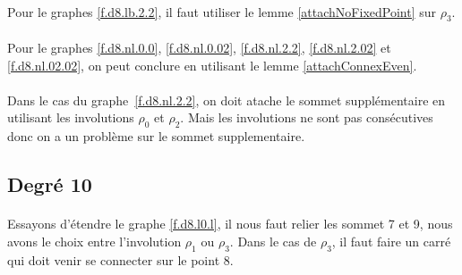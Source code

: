 \paragraph{}
Pour le graphes \ref{f.d8.lb.2.2}, il faut utiliser le lemme \ref{attachNoFixedPoint} sur $\rho_3$.

\paragraph{}
Pour le graphes \ref{f.d8.nl.0.0}, \ref{f.d8.nl.0.02}, \ref{f.d8.nl.2.2}, \ref{f.d8.nl.2.02} et \ref{f.d8.nl.02.02}, on peut conclure en utilisant le lemme \ref{attachConnexEven}.

\paragraph{}
Dans le cas du graphe~\ref{f.d8.nl.2.2}, on doit atache le sommet supplémentaire en utilisant les involutions $\rho_0$ et $\rho_2$. Mais les involutions ne sont pas consécutives donc on a un problème sur le sommet supplementaire.

\subsection{Degré 10}

\paragraph{}
Essayons d'étendre le graphe \ref{f.d8.l0.l}, il nous faut relier les sommet 7 et 9, nous avons le choix entre l'involution $\rho_1$ ou $\rho_3$. Dans le cas de $\rho_3$, il faut faire un carré qui doit venir se connecter sur le point 8.


